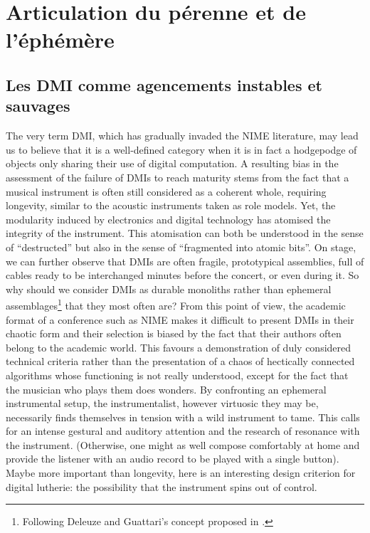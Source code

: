 \section{Articulation du pérenne et de l'éphémère}
\subsection{Les DMI comme agencements instables et sauvages}
The very term DMI, which has gradually invaded the NIME literature, may lead us to believe that it is a well-defined category when it is in fact a hodgepodge of objects only sharing their use of digital computation. A resulting bias in the assessment of the failure of DMIs to reach maturity stems from the fact that a musical instrument is often still considered as a coherent whole, requiring longevity, similar to the acoustic instruments taken as role models.
	Yet, the modularity induced by electronics and digital technology has atomised the integrity of the instrument. This atomisation can both be understood in the sense of “destructed” but also in the sense of “fragmented into atomic bits”. On stage, we can further observe that DMIs are often fragile, prototypical assemblies, full of cables ready to be interchanged minutes before the concert, or even during it. So why should we consider DMIs as durable monoliths rather than ephemeral assemblages\footnote{Following Deleuze and Guattari's concept proposed in \cite{deleuze_mille_1980}.} that they most often are?
	From this point of view, the academic format of a conference such as NIME makes it difficult to present DMIs in their chaotic form and their selection is biased by the fact that their authors often belong to the academic world. This favours a demonstration of duly considered technical criteria rather than the presentation of a chaos of hectically connected algorithms whose functioning is not really understood, except for the fact that the musician who plays them does wonders.
	By confronting an ephemeral instrumental setup, the instrumentalist, however virtuosic they may be, necessarily finds themselves in tension with a wild instrument to tame. This calls for an intense gestural and auditory attention and the research of resonance with the instrument. (Otherwise, one might as well compose comfortably at home and provide the listener with an audio record to be played with a single button). Maybe more important than longevity, here is an interesting design criterion for digital lutherie: the possibility that the instrument spins out of control.
	

